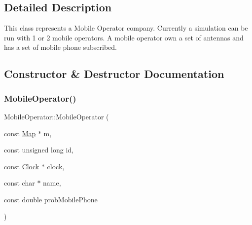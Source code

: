 \subsection{Detailed Description}
This class represents a Mobile Operator company. Currently a simulation can be run with 1 or 2 mobile operators. A mobile operator own a set of antennas and has a set of mobile phone subscribed. 

\subsection{Constructor \& Destructor Documentation}
\mbox{\label{class_mobile_operator_a8a8ad5fccedc56a31118f248f2aa332f}} 
\subsubsection{\texorpdfstring{Mobile\+Operator()}{MobileOperator()}}
{\footnotesize\ttfamily Mobile\+Operator\+::\+Mobile\+Operator (\begin{DoxyParamCaption}\item[{const \hyperlink{class_map}{Map} $\ast$}]{m,  }\item[{const unsigned long}]{id,  }\item[{const \hyperlink{class_clock}{Clock} $\ast$}]{clock,  }\item[{const char $\ast$}]{name,  }\item[{const double}]{prob\+Mobile\+Phone }\end{DoxyParamCaption})}

